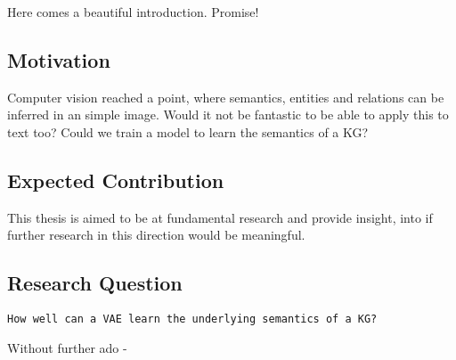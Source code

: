 Here comes a beautiful introduction. Promise!

\subsection{Motivation}

Computer vision reached a point, where semantics, entities and relations can be inferred in an simple image.
Would it not be fantastic to be able to apply this to text too?
Could we train a model to learn the semantics of a KG?

\subsection{Expected Contribution}

This thesis is aimed to be at fundamental research and provide insight, into if further research in this direction would be meaningful.

\subsection{Research Question}

\texttt{How well can a VAE learn the underlying semantics of a KG?}


Without further ado -
